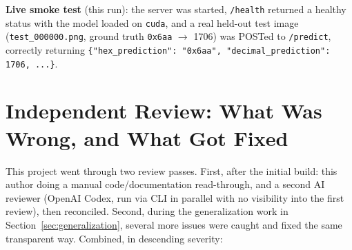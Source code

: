 \documentclass[11pt]{article}
\begin{document}
\textbf{Live smoke test} (this run): the server was started, \texttt{/health} returned a
healthy status with the model loaded on \texttt{cuda}, and a real held-out test image
(\texttt{test\_000000.png}, ground truth \texttt{0x6aa} $\to$ 1706) was POSTed to
\texttt{/predict}, correctly returning
\texttt{\{"hex\_prediction": "0x6aa", "decimal\_prediction": 1706, ...\}}.

\section{Independent Review: What Was Wrong, and What Got Fixed}
\label{sec:review}

This project went through two review passes. First, after the initial build: this
author doing a manual code/documentation read-through, and a second AI reviewer (OpenAI
Codex, run via CLI in parallel with no visibility into the first review), then
reconciled. Second, during the generalization work in Section~\ref{sec:generalization},
several more issues were caught and fixed the same transparent way. Combined, in
descending severity:
\end{document}
